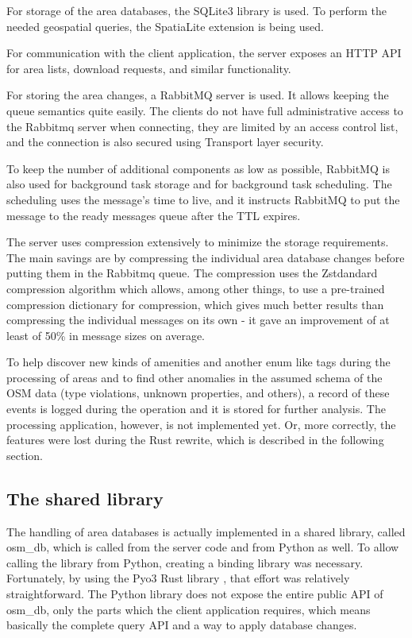 \documentclass[nolof,digital]{fithesis3}
\begin{document}
For storage of the area databases, the SQLite3 library \parencite{sqlite} is used. To perform the needed geospatial queries, the SpatiaLite extension \parencite{spatialite} is being used.

For communication with the client application, the server exposes an HTTP API for area lists, download requests, and similar functionality. 

For storing the area changes, a RabbitMQ \parencite{rabbitmq} server is used. It allows keeping the queue semantics quite easily. The clients do not have full administrative access to the Rabbitmq server when connecting, they are limited by an access control list, and the connection is also secured using Transport layer security.

To keep the number of additional components as low as possible, RabbitMQ is also used for background task storage and for background task scheduling. The scheduling uses the message's time to live, and it instructs RabbitMQ to put the message to the ready messages queue after the TTL expires.

The server uses compression extensively to minimize the storage requirements. The main savings are by compressing the individual area database changes before putting them in the Rabbitmq queue. The compression uses the Zstdandard compression algorithm \parencite{zstd} which allows, among other things, to use a pre-trained compression dictionary for compression, which gives much better results than compressing the individual messages on its own - it gave an improvement of at least of 50\% in message sizes on average.

To help discover new kinds of amenities and another enum like tags during the processing of areas and to find other anomalies in the assumed schema of the OSM data (type violations, unknown properties, and others), a record of these events is logged during the operation and it is stored for further analysis. The processing application, however, is not implemented yet. Or, more correctly, the features were lost during the Rust rewrite, which is described in the following section.
\subsection{The shared library}
The handling of area databases is actually implemented in a shared library, called osm\_db, which is called from the server code and from Python as well. To allow calling the library from Python, creating a binding library was necessary. Fortunately, by using the Pyo3 Rust library \parencite{pyo3}, that effort was relatively straightforward. The Python library does not expose the entire public API of osm\_db, only the parts which the client application requires, which means basically the complete query API and a way to apply database changes.
\end{document}
